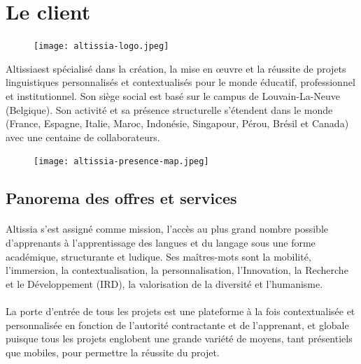 \section{Le client}
\label{sec:customer}

\begin{figure}
    \centering
    \texttt{[image: altissia-logo.jpeg]}
\end{figure}

Altissia\fnmark est spécialisé dans la création, la mise en œuvre et la réussite de projets linguistiques personnalisés et contextualisés pour le monde éducatif, professionnel et institutionnel.  
Son siège social est basé sur le campus de Louvain-La-Neuve (Belgique).
Son activité et sa présence structurelle s’étendent dans le monde (France, Espagne, Italie, Maroc, Indonésie, Singapour, Pérou, Brésil et Canada) avec une centaine de collaborateurs.
\begin{figure}
    \centering
    \texttt{[image: altissia-presence-map.jpeg]}
\end{figure}


\subsection{Panorema des offres et services}
\paragraph{}
Altissia s’est assigné comme mission, l’accès au plus grand nombre possible d’apprenants à l’apprentissage des langues et du langage sous une forme académique, structurante et ludique. Ses maîtres-mots sont la mobilité, l’immersion, la contextualisation, la personnalisation, l’Innovation, la Recherche et le Développement (IRD), la valorisation de la diversité et l’humanisme.

\paragraph{}
La porte d’entrée de tous les projets est une plateforme à la fois contextualisée et personnalisée en fonction de l’autorité contractante et de l’apprenant,
et globale puisque tous les projets englobent une grande variété de moyens,
tant présentiels que mobiles, pour permettre la réussite du projet.

